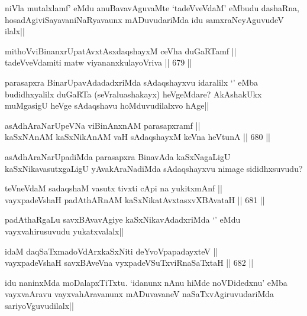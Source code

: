 \begin{artha}
niVla mutalxlamf' eMdu anuBavavAguvaMte `tadeVveVdaM' eMbudu dashaRna, hosadAgiviSayavaniNaRyavaunx mADuvudariMda idu samxraNeyAguvudeV ilalx||
\end{artha}

\begin{shl}
mithoVviBinanxrUpatAvxtAsxdaqshayxM ceVha duGaRTamf || \\
tadeVveVdamiti matw viyananxkulayoVriva ||  679 ||  
\end{shl}

\begin{artha}
parasapxra BinarUpavAdadadxriMda sAdaqshayxvu idaralilx `\stext' eMba budidhxyalilx duGaRTa (seVraluashakayx) heVgeMdare? AkAshakUkx muMgasigU heVge sAdaqshavu hoMduvudilalxvo hAge||
\end{artha}

\begin{shl}
asAdhAraNarUpeVNa viBinAnxnAM parasapxramf || \\
kaSxNAnAM kaSxNikAnAM vaH sAdaqshayxM keVna heVtunA ||  680 ||  
\end{shl}

\begin{artha}
asAdhAraNarUpadiMda parasapxra BinavAda kaSxNagaLigU kaSxNikavasutxgaLigU yAvakAraNadiMda sAdaqshayxvu nimage sididhxsuvudu? 
\end{artha}


\begin{shl}
teVneVdaM sadaqshaM vasutx tivxti cApi na yukitxmAnf || \\
vayxpadeVshaH padAthARnAM kaSxNikatAvxtasxvXBAvataH ||  681 ||  
\end{shl}

\begin{artha}
padAthaRgaLu savxBAvavAgiye kaSxNikavAdadxriMda `\stext' eMdu vayxvahirusuvudu yukatxvalalx||
\end{artha}

\begin{shl}
idaM daqSaTxmadoV\s dArxkaSxNiti deYvoVpapadayxteV || \\
vayxpadeVshaH savxBAveVna vyxpadeVSuTxviRnaSaTxtaH ||  682 ||  
\end{shl}

\begin{artha}
idu naninxMda moDalapxTiTxtu. `idanunx nAnu hiMde noVDidedxnu' eMba vayxvaAravu vayxvahAravanunx mADuvavaneV naSaTxvAgiruvudariMda sariyoVguvudilalx||
\end{artha}

